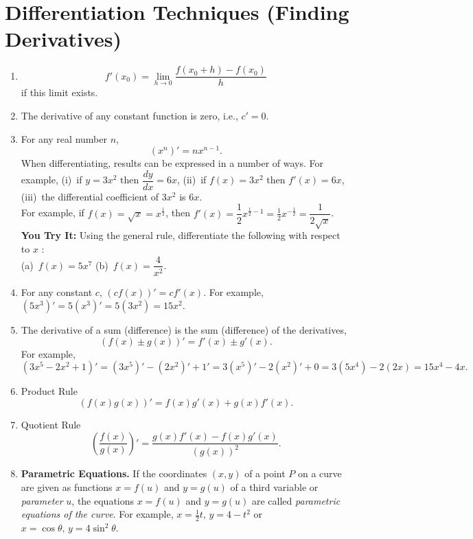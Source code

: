 \documentclass[titlepage,a4paper,12pt]{report}
\begin{document}
\section{Differentiation Techniques (Finding Derivatives)}
\begin{enumerate}
\item \begin{equation*}
f'(x_0)=\lim _{h\rightarrow 0}\dfrac{f(x_0+h)-f(x_0)}{h}
\end{equation*}
if this limit exists.
\item The derivative of any constant function is zero, i.e., $c'=0$.
\item For any real number $n$, 
\begin{equation*}
(x^n)'=nx^{n-1}.
\end{equation*}
When differentiating, results can be expressed in a number of ways. For example, (i)\, if $y=3x^2$ then $\dfrac{dy}{dx}=6x$, \quad (ii)\, if $f(x)=3x^2$ then $f'(x)=6x$, \quad (iii)\, the differential coefficient of $3x^2$ is $6x$. \\
For example, if $f(x)=\sqrt{x}=x^{\frac{1}{2}}$, then $f'(x)=\dfrac{1}{2}x^{\frac{1}{2}-1}=\frac{1}{2}x^{-\frac{1}{2}}=\dfrac{1}{2\sqrt{x}}$.\\
\textbf{You Try It:} Using the general rule, differentiate the following with respect to $x$ :\\ (a)\, $f(x)=5x^7$ \quad (b)\, $f(x)=\dfrac{4}{x^2}$.
\item For any constant $c$, $(cf(x))'=cf'(x)$. For example, $(5x^3)'=5(x^3)'=5(3x^2)=15x^2$.
\item The derivative of a sum (difference) is the sum (difference) of the derivatives, 
\begin{equation*}
(f(x)\pm g(x))'=f'(x)\pm g'(x).
\end{equation*}
For example, \[(3x^5-2x^2+1)'=(3x^5)'-(2x^2)'+1'=3(x^5)'-2(x^2)'+0=3(5x^4)-2(2x)=15x^4-4x.\]
\item Product Rule 
\begin{equation*}
(f(x)g(x))'=f(x)g'(x)+g(x)f'(x).
\end{equation*}
\item Quotient Rule
\begin{equation*}
\left(\dfrac{f(x)}{g(x)}\right)'=\dfrac{g(x)f'(x)-f(x)g'(x)}{(g(x))^2}.
\end{equation*}
\item \textbf{Parametric Equations.} If the coordinates $(x,y)$ of a point $P$ on a curve are given as functions $x=f(u)$ and $y=g(u)$ of a third variable or \textit{parameter} $u$, the equations $x=f(u)$ and $y=g(u)$ are called \textit{parametric equations of the curve}. For example, $x=\frac{1}{2}t, \, y=4-t^2$ or $x=\cos \theta, \, y=4\sin ^2 \theta$.


\end{enumerate}
\end{document}
